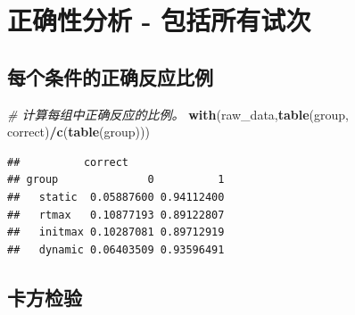 \documentclass[
]{article}
\newenvironment{Shaded}{\begin{snugshade}}{\end{snugshade}}
\newcommand{\AttributeTok}[1]{\textcolor[rgb]{0.13,0.29,0.53}{#1}}
\newcommand{\CommentTok}[1]{\textcolor[rgb]{0.56,0.35,0.01}{\textit{#1}}}
\newcommand{\FunctionTok}[1]{\textcolor[rgb]{0.13,0.29,0.53}{\textbf{#1}}}
\newcommand{\NormalTok}[1]{#1}
\newcommand{\OtherTok}[1]{\textcolor[rgb]{0.56,0.35,0.01}{#1}}
\newcommand{\SpecialCharTok}[1]{\textcolor[rgb]{0.81,0.36,0.00}{\textbf{#1}}}
\newcommand{\StringTok}[1]{\textcolor[rgb]{0.31,0.60,0.02}{#1}}
\begin{document}
\begin{Shaded}
\end{Shaded}

\section{正确性分析 -
包括所有试次}\label{ux6b63ux786eux6027ux5206ux6790---ux5305ux62ecux6240ux6709ux8bd5ux6b21}

\subsection{每个条件的正确反应比例}\label{ux6bcfux4e2aux6761ux4ef6ux7684ux6b63ux786eux53cdux5e94ux6bd4ux4f8b}

\begin{Shaded}
\begin{Highlighting}[]
\CommentTok{\# 计算每组中正确反应的比例。}
\FunctionTok{with}\NormalTok{(raw\_data,}\FunctionTok{table}\NormalTok{(group, correct)}\SpecialCharTok{/}\FunctionTok{c}\NormalTok{(}\FunctionTok{table}\NormalTok{(group)))}
\end{Highlighting}
\end{Shaded}

\begin{verbatim}
##          correct
## group              0          1
##   static  0.05887600 0.94112400
##   rtmax   0.10877193 0.89122807
##   initmax 0.10287081 0.89712919
##   dynamic 0.06403509 0.93596491
\end{verbatim}

\subsection{卡方检验}\label{ux5361ux65b9ux68c0ux9a8c}
\end{document}
